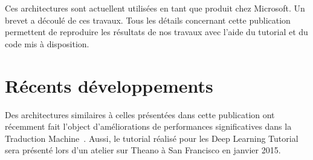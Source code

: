 Ces architectures sont actuellent utilisées en tant que produit chez Microsoft.
Un brevet a découlé de ces travaux. Tous les détails concernant cette
publication permettent de reproduire les résultats de nos travaux avec l'aide
du tutorial et du code mis à disposition. 

\section{R\'{e}cents d\'{e}veloppements}

Des architectures similaires à celles présentées dans cette publication ont
récemment fait l'object d'améliorations de performances significatives dans la
Traduction Machine~\citep{Seq-14}. Aussi, le tutorial réalisé pour les Deep
Learning Tutorial sera présenté lors d'un atelier sur Theano à San Francisco en
janvier 2015.


